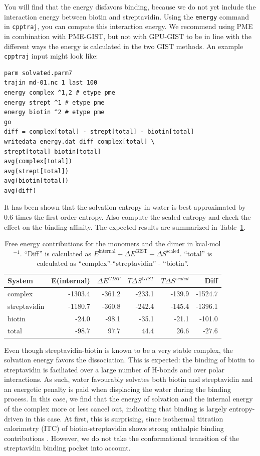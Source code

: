 \documentclass[9pt,tutorial]{livecoms}
\newcommand{\software}{\texttt}
\newcommand\inlinecode{\texttt}
\begin{document}
You will find that the energy disfavors binding, because we do not yet include the interaction energy between biotin and streptavidin.
Using the \inlinecode{energy} command in \software{cpptraj}, you can compute this interaction energy.
We recommend using PME in combination with PME-GIST, but not with GPU-GIST to be in line with the different ways the energy is calculated in the two GIST methods.
An example \software{cpptraj} input might look like:
\begin{lstlisting}[style=cpptraj]
parm solvated.parm7
trajin md-01.nc 1 last 100
energy complex ^1,2 # etype pme
energy strept ^1 # etype pme
energy biotin ^2 # etype pme
go
diff = complex[total] - strept[total] - biotin[total]
writedata energy.dat diff complex[total] \
strept[total] biotin[total]
avg(complex[total])
avg(strept[total])
avg(biotin[total])
avg(diff)
\end{lstlisting}
It has been shown \cite{Chen2021,Waibl2022-gist-solvents} that the solvation entropy in water is best approximated by 0.6 times the first order entropy.
Also compute the scaled entropy and check the effect on the binding affinity.
The expected results are summarized in Table~\ref{tab_dg_monomers_dimer}.


\begin{table}[h]
	\caption{Free energy contributions for the monomers and the dimer in kcal$\cdot$mol$^{-1}$. ``Diff'' is calculated as 
	$E^\text{internal} + \Delta E^\text{GIST} - \Delta S^\text{scaled}$. ``total'' is calculated as 
	``complex''-``streptavidin'' - ``biotin''.}\label{tab_dg_monomers_dimer}
	\small
	\begin{tabular}{@{}lrrrrr@{}}
		\toprule
		System       & E(internal) & $\Delta E^\textit{GIST}$ & $T\Delta S^\textit{GIST}$ & $T\Delta S^\textit{scaled}$ & Diff \\
		\midrule
		complex      & -1303.4 & -361.2 & -233.1 & -139.9 & -1524.7 \\
		streptavidin & -1180.7 & -360.8 & -242.4 & -145.4 & -1396.1 \\
		biotin       & -24.0   &  -98.1 &  -35.1 &  -21.1 &  -101.0 \\
		\midrule
		total         & -98.7   &   97.7 &   44.4 &   26.6 &   -27.6 \\
		\bottomrule
	\end{tabular}
\end{table}
Even though streptavidin-biotin is known to be a very stable complex, the solvation energy favors the dissociation.
This is expected: the binding of biotin to streptavidin is faciliated over a large number of H-bonds and over polar interactions. 
As such, water favourably solvates both biotin and streptavidin and an energetic penalty is paid when displacing the water during the binding process. 
In this case, we find that the energy of solvation and the internal energy of the complex more or less cancel out, indicating that binding is largely entropy-driven in this case.
At first, this is surprising, since isothermal titration calorimetry (ITC) of biotin-streptavidin shows strong enthalpic binding contributions \cite{mpye2020-biotin-itc,hyre2006-biotin-itc}.
However, we do not take the conformational transition of the streptavidin binding pocket into account.
\end{document}
